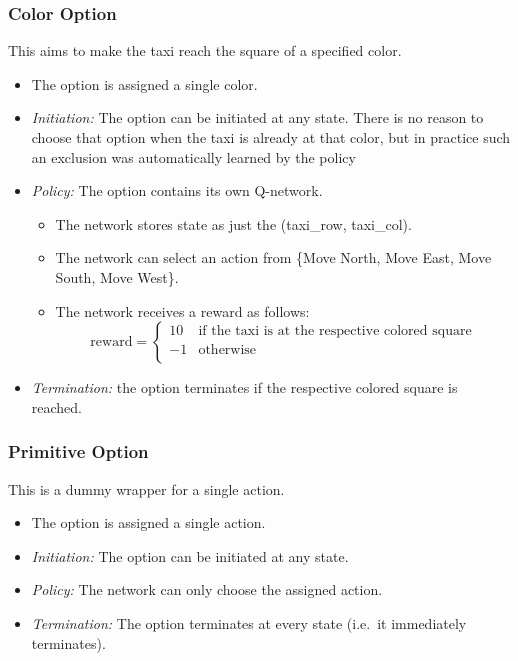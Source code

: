 \documentclass[A4]{article}
\begin{document}
    \subsubsection{Color Option}
    \noindent This aims to make the taxi reach the square of a specified color.
    \begin{itemize}
        \item The option is assigned a single color.
        \item \emph{Initiation:} The option can be initiated at any state.
        There is no reason to choose that option when the taxi is already at that color, but in practice such an exclusion was automatically learned by the policy
        \item \emph{Policy:} The option contains its own Q-network.
        \begin{itemize}
            \item The network stores state as just the (taxi\_row, taxi\_col).
            \item The network can select an action from \{Move North, Move East, Move South, Move West\}.
            \item The network receives a reward as follows:
            \[
                \text{reward}= \left\{
                \begin{array}{ll}
                    10 & \text{if the taxi is at the respective colored square} \\
                    -1 & \text{otherwise}                                       \\
                \end{array}
                \right.
            \]
        \end{itemize}
        \item \emph{Termination:} the option terminates if the respective colored square is reached.
    \end{itemize}

    \subsubsection{Primitive Option}
    \noindent This is a dummy wrapper for a single action.
    \begin{itemize}
        \item The option is assigned a single action.
        \item \emph{Initiation:} The option can be initiated at any state.
        \item \emph{Policy:} The network can only choose the assigned action.
        \item \emph{Termination:} The option terminates at every state (i.e.\ it immediately terminates).
    \end{itemize}
\end{document}
